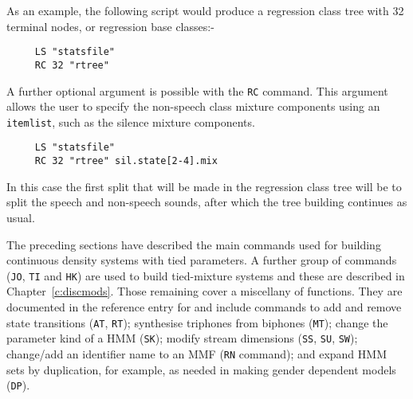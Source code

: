 As an example, the following  script would produce a 
regression class tree with 32 terminal nodes, or regression base
classes:-
\begin{verbatim}
     LS "statsfile"
     RC 32 "rtree"
\end{verbatim}

A further optional argument is possible with the 
\texttt{RC} command. 
This argument allows the user to specify the non-speech class
mixture components using an \texttt{itemlist}, 
such as the silence mixture components. 
\begin{verbatim}
     LS "statsfile"
     RC 32 "rtree" sil.state[2-4].mix
\end{verbatim}
In this case the first split that will be made in the regression class tree
will be to split the speech and non-speech sounds, after which the
tree building continues as usual. 


The preceding sections have described the main  commands used for
building continuous density systems with tied parameters.  A further group
of commands (\texttt{JO}, \texttt{TI} and \texttt{HK}) are used to build
tied-mixture systems and these are described in Chapter~\ref{c:discmods}.
Those
remaining cover a miscellany of functions.  They are documented in the
reference entry for  and include commands to add and remove
state transitions 
(\texttt{AT},
\texttt{RT}); synthesise triphones from
biphones (\texttt{MT}); 
change the parameter kind of a HMM (\texttt{SK});
modify stream dimensions (\texttt{SS},
\texttt{SU},
\texttt{SW}); change/add an identifier name
to an MMF (\texttt{RN} command); and expand
HMM sets by duplication, for example, as needed in making gender
dependent models (\texttt{DP}).


